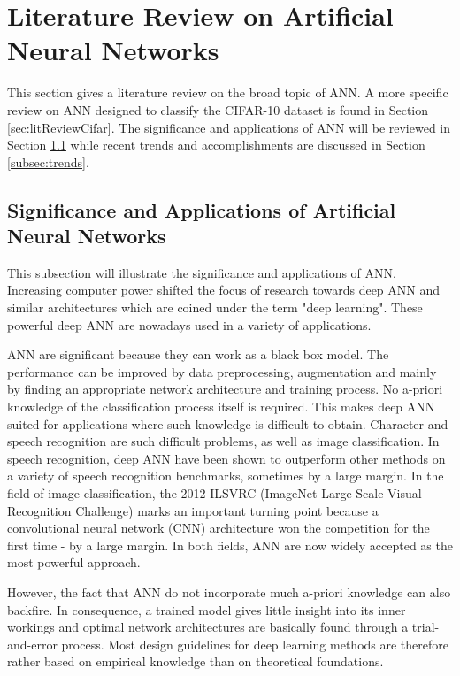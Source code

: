 \section{Literature Review on Artificial Neural Networks}\label{sec:litGeneral}
     \pagestyle{mario}

This section gives a literature review on the broad topic of ANN. A more specific review on ANN designed to classify the CIFAR-10 dataset is found in Section \ref{sec:litReviewCifar}. The significance and applications of ANN will be reviewed in Section \ref{subsec:signif} while recent trends and accomplishments are discussed in Section \ref{subsec:trends}.

\subsection{Significance and Applications of Artificial Neural Networks}\label{subsec:signif}

This subsection will illustrate the significance and applications of ANN. Increasing computer power shifted the focus of research towards deep ANN and similar architectures which are coined under the term "deep learning". These powerful  deep ANN are nowadays used in a variety of applications\cite{deng2014deep}\cite{lecun2015deep}.

ANN are significant because they can work as a black box model. The performance can be improved by data preprocessing, augmentation and mainly by finding an appropriate network architecture and training process. No a-priori knowledge of the classification process itself is required. This makes deep ANN suited for applications where such knowledge is difficult to obtain. Character and speech recognition are such difficult problems, as well as image classification. In speech recognition, deep ANN have been shown to outperform other methods on a variety of speech recognition benchmarks, sometimes by a large margin\cite{hinton2012deep}. In the field of image classification, the 2012 ILSVRC (ImageNet Large-Scale Visual Recognition Challenge) marks an important turning point because a convolutional neural network (CNN) architecture won the competition for the first time - by a large margin\cite{krizhevsky}. In both fields, ANN are now widely accepted as the most powerful approach.

However, the fact that ANN do not incorporate much a-priori knowledge can also backfire. In consequence, a trained model gives little insight into its inner workings and optimal network architectures are basically found through a trial-and-error process. Most design guidelines for deep learning methods are therefore rather based on empirical knowledge than on theoretical foundations.


